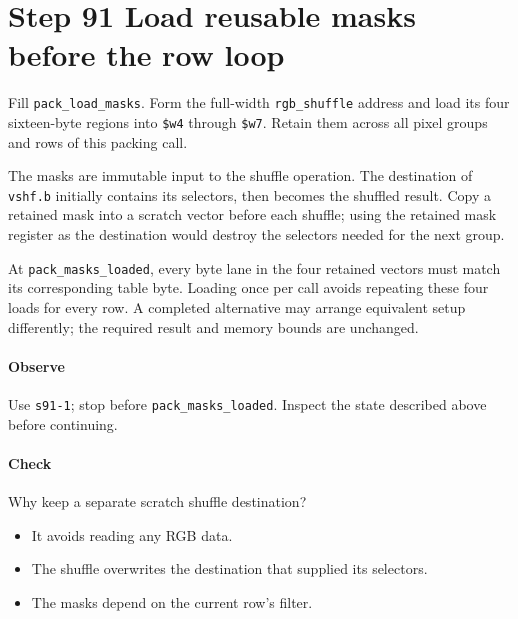\section{Step 91 Load reusable masks before the row loop}
Fill \texttt{pack\_load\_masks}. Form the full-width \texttt{rgb\_shuffle} address and load its four sixteen-byte regions into \texttt{\$w4} through \texttt{\$w7}. Retain them across all pixel groups and rows of this packing call.

The masks are immutable input to the shuffle operation. The destination of \texttt{vshf.b} initially contains its selectors, then becomes the shuffled result. Copy a retained mask into a scratch vector before each shuffle; using the retained mask register as the destination would destroy the selectors needed for the next group.

At \texttt{pack\_masks\_loaded}, every byte lane in the four retained vectors must match its corresponding table byte. Loading once per call avoids repeating these four loads for every row. A completed alternative may arrange equivalent setup differently; the required result and memory bounds are unchanged.

\paragraph{Observe} Use \texttt{s91-1}; stop before \texttt{pack\_masks\_loaded}. Inspect the state described above before continuing.

\paragraph{Check} Why keep a separate scratch shuffle destination?
\begin{itemize}
  \item[A.] It avoids reading any RGB data.
  \item[B.] The shuffle overwrites the destination that supplied its selectors.
  \item[C.] The masks depend on the current row’s filter.
\end{itemize}
